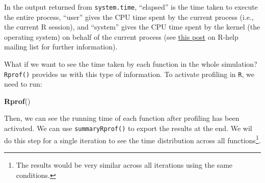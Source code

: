 \documentclass[
]{book}
\newenvironment{Shaded}{\begin{snugshade}}{\end{snugshade}}
\newcommand{\CommentTok}[1]{\textcolor[rgb]{0.56,0.35,0.01}{\textit{#1}}}
\newcommand{\DataTypeTok}[1]{\textcolor[rgb]{0.13,0.29,0.53}{#1}}
\newcommand{\DecValTok}[1]{\textcolor[rgb]{0.00,0.00,0.81}{#1}}
\newcommand{\KeywordTok}[1]{\textcolor[rgb]{0.13,0.29,0.53}{\textbf{#1}}}
\newcommand{\NormalTok}[1]{#1}
\newcommand{\OperatorTok}[1]{\textcolor[rgb]{0.81,0.36,0.00}{\textbf{#1}}}
\newcommand{\StringTok}[1]{\textcolor[rgb]{0.31,0.60,0.02}{#1}}
\begin{document}
In the output returned from \texttt{system.time}, ``elapsed'' is the time taken to execute the entire process, ``user'' gives the CPU time spent by the current process (i.e., the current R session), and ``system'' gives the CPU time spent by the kernel (the operating system) on behalf of the current process (see \href{https://r.789695.n4.nabble.com/Meaning-of-proc-time-td2303263.html\#a2306691}{this post} on R-help mailing list for further information).

What if we want to see the time taken by each function in the whole simulation? \texttt{Rprof()} provides us with this type of information. To activate profiling in \texttt{R}, we need to run:

\begin{Shaded}
\begin{Highlighting}[]
\KeywordTok{Rprof}\NormalTok{()}
\end{Highlighting}
\end{Shaded}

Then, we can see the running time of each function after profiling has been activated. We can use \texttt{summaryRprof()} to export the results at the end. We wil do this step for a single iteration to see the time distribution across all functions\footnote{The results would be very similar across all iterations using the same conditions.}.

\begin{Shaded}
\end{Shaded}
\end{document}
